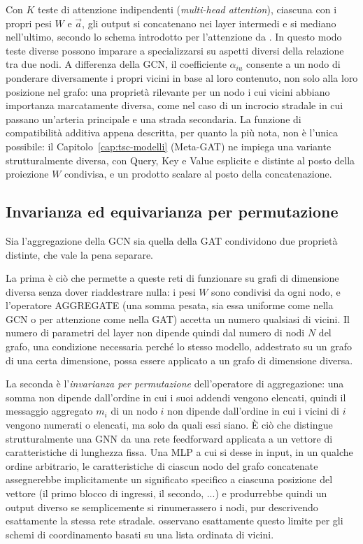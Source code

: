 Con $K$ teste di attenzione indipendenti (\emph{multi-head attention}),
ciascuna con i propri pesi $W$ e $\vec a$, gli output si concatenano nei
layer intermedi e si mediano nell'ultimo, secondo lo schema introdotto per
l'attenzione da \citet{vaswani2017attention}. In questo modo teste diverse possono
imparare a specializzarsi su aspetti diversi della relazione tra due nodi.
A differenza della GCN, il coefficiente $\alpha_{iu}$ consente a un nodo
di ponderare diversamente i propri vicini in base al loro contenuto, non
solo alla loro posizione nel grafo: una proprietà rilevante per
un nodo i cui vicini abbiano importanza marcatamente diversa,
come nel caso di un incrocio stradale in cui passano un'arteria principale e una strada
secondaria. La funzione di compatibilità additiva appena descritta, per
quanto la più nota, non è l'unica possibile: il Capitolo~\ref{cap:tsc-modelli}
(Meta-GAT) ne impiega una variante strutturalmente diversa, con Query, Key
e Value esplicite e distinte al posto della proiezione $W$ condivisa, e un
prodotto scalare al posto della concatenazione.

\subsection{Invarianza ed equivarianza per permutazione}
\label{subsec:permutation-invariance}

Sia l'aggregazione della GCN sia quella della GAT condividono due
proprietà distinte, che vale la pena separare.

La prima è ciò che permette a queste reti di funzionare su grafi di
dimensione diversa senza dover riaddestrare nulla: i pesi $W$ sono
condivisi da ogni nodo, e l'operatore AGGREGATE (una somma pesata, sia
essa uniforme come nella GCN o per attenzione come nella GAT) accetta un
numero qualsiasi di vicini. Il numero di parametri del layer non dipende
quindi dal numero di nodi $N$ del grafo, una condizione necessaria perché
lo stesso modello, addestrato su un grafo di una certa dimensione, possa
essere applicato a un grafo di dimensione diversa.

La seconda è l'\emph{invarianza per permutazione} dell'operatore di
aggregazione: una somma non dipende dall'ordine in cui i suoi addendi
vengono elencati, quindi il messaggio aggregato $m_i$ di un nodo $i$ non
dipende dall'ordine in cui i vicini di $i$ vengono numerati o elencati,
ma solo da quali essi siano. È ciò che distingue strutturalmente una GNN
da una rete feedforward applicata a un vettore di caratteristiche di
lunghezza fissa. Una MLP a cui si desse in input, in un
qualche ordine arbitrario, le caratteristiche di ciascun nodo del grafo
concatenate assegnerebbe implicitamente un significato specifico a ciascuna
posizione del vettore (il primo blocco di ingressi, il secondo, ...) e
produrrebbe quindi un output diverso se semplicemente si rinumerassero i
nodi, pur descrivendo esattamente la stessa rete stradale.
\citet{wei2019colight} osservano esattamente questo limite per gli schemi
di coordinamento basati su una lista ordinata di vicini.

